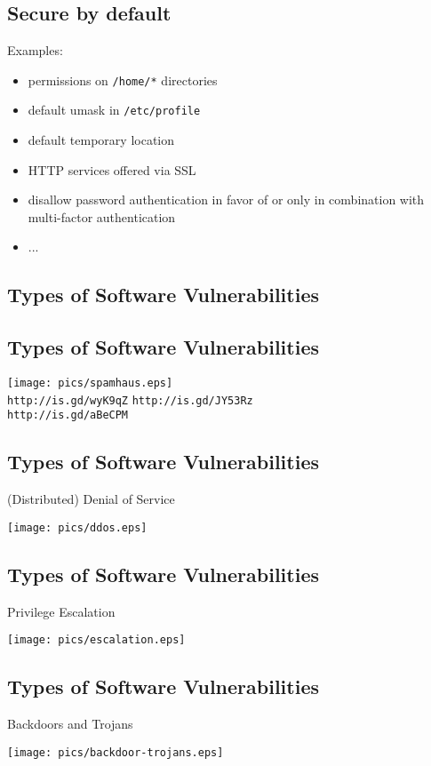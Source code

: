 \documentclass[xga]{xdvislides}
\begin{document}
\subsection{Secure by default}
Examples:
\begin{itemize}
	\item permissions on \verb+/home/*+ directories
	\item default umask in \verb+/etc/profile+
	\item default temporary location
	\item HTTP services offered via SSL
	\item disallow password authentication in favor of or only in
		combination with multi-factor authentication
	\item ...
\end{itemize}


\subsection{Types of Software Vulnerabilities}

\subsection{Types of Software Vulnerabilities}
\begin{center}
	\texttt{[image: pics/spamhaus.eps]} \\
\verb+http://is.gd/wyK9qZ+ \verb+http://is.gd/JY53Rz+ \\
\verb+http://is.gd/aBeCPM+
\end{center}


\subsection{Types of Software Vulnerabilities}
(Distributed) Denial of Service
\begin{center}
	\texttt{[image: pics/ddos.eps]}
\end{center}

\subsection{Types of Software Vulnerabilities}
Privilege Escalation
\begin{center}
	\texttt{[image: pics/escalation.eps]}
\end{center}

\subsection{Types of Software Vulnerabilities}
Backdoors and Trojans
\begin{center}
	\texttt{[image: pics/backdoor-trojans.eps]}
\end{center}
\end{document}

